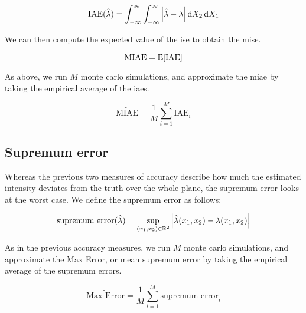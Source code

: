\begin{equation}
    \mbox{IAE}(\hat{\lambda}) = \int_{-\infty}^{\infty} \int_{-\infty}^{\infty} \left| \hat{\lambda} - \lambda \right| \mathop{}\!\mathrm{d}{X_2} \mathop{}\!\mathrm{d}{X_1}
\end{equation}

We can then compute the expected value of the \gls{ise} to obtain the \gls{mise}.

\begin{equation}
    \mbox{MIAE} = \mathbb{E} [\mbox{IAE}]
\end{equation}

As above, we run \(M\) monte carlo simulations, and approximate the \gls{miae} by taking the empirical average of the \glspl{iae}.

\begin{equation}
    \widetilde{\mbox{MIAE}} = \frac{1}{M} \sum_{i=1}^{M} \mbox{IAE}_i
\end{equation}

\subsection{Supremum error}
\label{subsec:method:sup_error}

Whereas the previous two measures of accuracy describe how much the estimated intensity deviates from the truth over the whole plane,
the \gls{supremum error} looks at the worst case.
We define the \gls{supremum error} as follows:

\begin{equation}
    \mbox{supremum error}(\hat{\lambda}) = \sup_{(x_1, x_2) \in \mathbb{R}^2}
        {\left|
            \hat{\lambda}(x_1, x_2) - \lambda(x_1, x_2)
        \right|}
\end{equation}

As in the previous accuracy measures, we run \(M\) monte carlo simulations, and approximate the Max Error, or mean supremum error by taking the empirical average of the supremum errors.

\begin{equation}
    \widetilde{\mbox{Max Error}} = \frac{1}{M} \sum_{i=1}^{M} \mbox{supremum error}_i
\end{equation}


